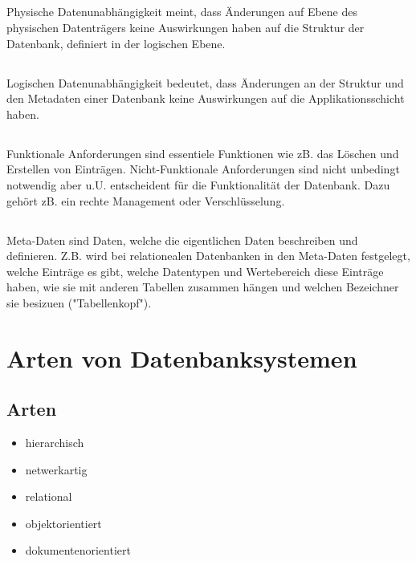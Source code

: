 \subsection{}
Physische Datenunabhängigkeit meint, dass Änderungen auf Ebene des physischen Datenträgers keine Auswirkungen haben auf die Struktur der Datenbank, definiert in der logischen Ebene.

\subsection{}
Logischen Datenunabhängigkeit bedeutet, dass Änderungen an der Struktur und den Metadaten einer Datenbank keine Auswirkungen auf die Applikationsschicht haben.

\subsection{}
Funktionale Anforderungen sind essentiele Funktionen wie zB. das Löschen und Erstellen von Einträgen. Nicht-Funktionale Anforderungen sind nicht unbedingt notwendig aber u.U. entscheident für die Funktionalität der Datenbank. Dazu gehört zB. ein rechte Management oder Verschlüsselung. 

\subsection{}
Meta-Daten sind Daten, welche die eigentlichen Daten beschreiben und definieren. Z.B. wird bei relationealen Datenbanken in den Meta-Daten festgelegt, welche Einträge es gibt, welche Datentypen und Wertebereich diese Einträge haben, wie sie mit anderen Tabellen zusammen hängen und welchen Bezeichner sie besizuen ("Tabellenkopf").

\section{Arten von Datenbanksystemen}
\subsection{Arten}
\begin{itemize}
\item  hierarchisch
\item netwerkartig
\item relational
\item objektorientiert
\item dokumentenorientiert
\end{itemize}

